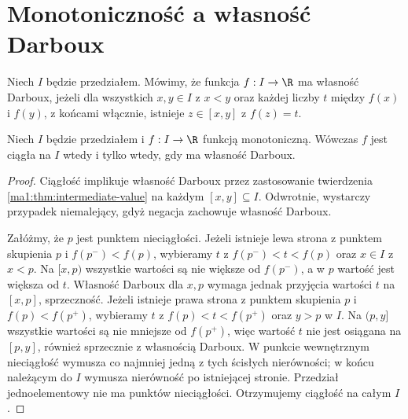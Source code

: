\section{Monotoniczność a własność Darboux}
\begin{definicja}
\label{ma1:def:darboux-property}
Niech $I$ będzie przedziałem. Mówimy, że funkcja $f:I\to\R$ ma własność Darboux, jeżeli dla wszystkich $x,y\in I$ z $x<y$ oraz każdej liczby $t$ między $f(x)$ i $f(y)$, z końcami włącznie, istnieje $z\in[x,y]$ z $f(z)=t$.
\end{definicja}
\begin{twierdzenie}
\label{ma1:thm:monotone-darboux-continuity}
Niech $I$ będzie przedziałem i $f:I\to\R$ funkcją monotoniczną. Wówczas $f$ jest ciągła na $I$ wtedy i tylko wtedy, gdy ma własność Darboux.
\end{twierdzenie}
\begin{proof}
Ciągłość implikuje własność Darboux przez zastosowanie twierdzenia \ref{ma1:thm:intermediate-value} na każdym $[x,y]\subseteq I$. Odwrotnie, wystarczy przypadek niemalejący, gdyż negacja zachowuje własność Darboux.

Załóżmy, że $p$ jest punktem nieciągłości. Jeżeli istnieje lewa strona z punktem skupienia $p$ i $f(p^-)<f(p)$, wybieramy $t$ z $f(p^-)<t<f(p)$ oraz $x\in I$ z $x<p$. Na $[x,p)$ wszystkie wartości są nie większe od $f(p^-)$, a w $p$ wartość jest większa od $t$. Własność Darboux dla $x,p$ wymaga jednak przyjęcia wartości $t$ na $[x,p]$, sprzeczność. Jeżeli istnieje prawa strona z punktem skupienia $p$ i $f(p)<f(p^+)$, wybieramy $t$ z $f(p)<t<f(p^+)$ oraz $y>p$ w $I$. Na $(p,y]$ wszystkie wartości są nie mniejsze od $f(p^+)$, więc wartość $t$ nie jest osiągana na $[p,y]$, również sprzecznie z własnością Darboux. W punkcie wewnętrznym nieciągłość wymusza co najmniej jedną z tych ścisłych nierówności; w końcu należącym do $I$ wymusza nierówność po istniejącej stronie. Przedział jednoelementowy nie ma punktów nieciągłości. Otrzymujemy ciągłość na całym $I$.
\end{proof}

